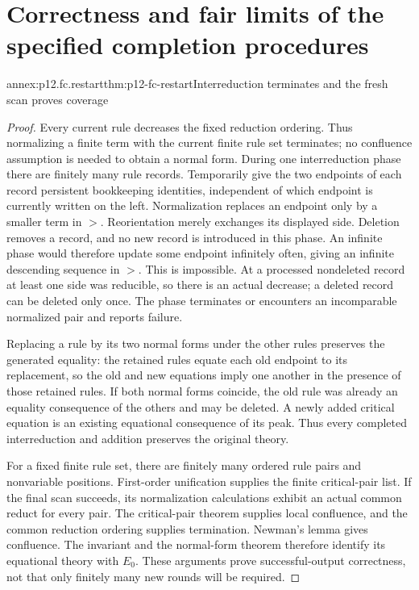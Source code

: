 \section{Correctness and fair limits of the specified completion procedures}

\begin{annexitem}{annex:p12.fc.restart}{thm:p12-fc-restart}{Interreduction terminates and the fresh scan proves coverage}
\begin{proof}
Every current rule decreases the fixed reduction ordering. Thus
normalizing a finite term with the current finite rule set terminates;
no confluence assumption is needed to obtain a normal form.
During one interreduction phase there are finitely many rule records.
Temporarily give the two endpoints of each record persistent bookkeeping
identities, independent of which endpoint is currently written on the
left. Normalization replaces an endpoint only by a smaller term in
\(>\). Reorientation merely exchanges its displayed side. Deletion
removes a record, and no new record is introduced in this phase.
An infinite phase would therefore update some endpoint infinitely
often, giving an infinite descending sequence in \(>\). This is
impossible. At a processed nondeleted record at least one side was
reducible, so there is an actual decrease; a deleted record can be
deleted only once. The phase terminates or encounters an incomparable
normalized pair and reports failure.

Replacing a rule by its two normal forms under the other rules
preserves the generated equality: the retained rules equate each
old endpoint to its replacement, so the old and new equations imply
one another in the presence of those retained rules. If both normal
forms coincide, the old rule was already an equality consequence of
the others and may be deleted. A newly added critical equation is
an existing equational consequence of its peak. Thus every completed
interreduction and addition preserves the original theory.

For a fixed finite rule set, there are finitely many ordered rule
pairs and nonvariable positions. First-order unification supplies
the finite critical-pair list. If the final scan succeeds, its
normalization calculations exhibit an actual common reduct for
every pair. The critical-pair theorem supplies local confluence,
and the common reduction ordering supplies termination. Newman's
lemma gives confluence. The invariant and the normal-form theorem
therefore identify its equational theory with \(E_0\).
These arguments prove successful-output correctness, not that only
finitely many new rounds will be required.
\end{proof}
\end{annexitem}

